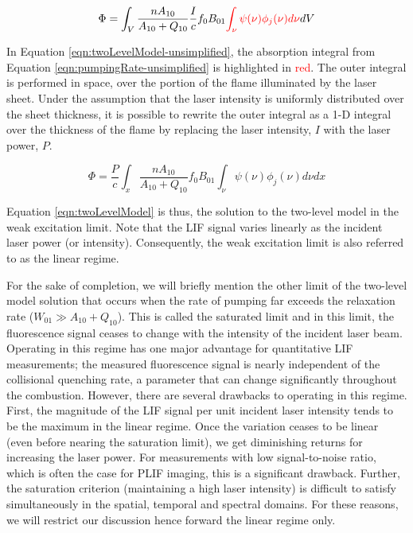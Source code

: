 \begin{equation}
  \Phi = \int_V \frac{n A_{10}}{A_{10} + Q_{10}} \frac{I}{c} f_0 B_{01} \textcolor{red}{\int_\nu \psi(\nu) \phi_j(\nu) d\nu} dV
  \label{eqn:twoLevelModel-unsimplified}
\end{equation}


In Equation \ref{eqn:twoLevelModel-unsimplified}, the absorption integral from Equation \ref{eqn:pumpingRate-unsimplified} is highlighted in \textcolor{red}{red}.
The outer integral is performed in space, over the portion of the flame illuminated by the laser sheet.
Under the assumption that the laser intensity is uniformly distributed over the sheet thickness, it is possible to rewrite the outer integral as a 1-D integral over the thickness of the flame by replacing the laser intensity, \(I\) with the laser power, \(P\).

\begin{equation}
  \Phi = \frac{P}{c} \int_x \frac{n A_{10}}{A_{10}+Q_{10}} f_0 B_{01} \int_\nu \psi(\nu) \phi_j(\nu) d\nu dx
  \label{eqn:twoLevelModel}
\end{equation}


Equation \ref{eqn:twoLevelModel} is thus, the solution to the two-level model in the weak excitation limit.
Note that the LIF signal varies linearly as the incident laser power (or intensity).
Consequently, the weak excitation limit is also referred to as the linear regime.

For the sake of completion, we will briefly mention the other limit of the two-level model solution that occurs when the rate of pumping far exceeds the relaxation rate (\(W_{01} \gg A_{10} + Q_{10}\)).
This is called the saturated limit and in this limit, the fluorescence signal ceases to change with the intensity of the incident laser beam.
Operating in this regime has one major advantage for quantitative LIF measurements; the measured fluorescence signal is nearly independent of the collisional quenching rate, a parameter that can change significantly throughout the combustion.
However, there are several drawbacks to operating in this regime.
First, the magnitude of the LIF signal per unit incident laser intensity tends to be the maximum in the linear regime.
Once the variation ceases to be linear (even before nearing the saturation limit), we get diminishing returns for increasing the laser power.
For measurements with low signal-to-noise ratio, which is often the case for PLIF imaging, this is a significant drawback.
Further, the saturation criterion (maintaining a high laser intensity) is difficult to satisfy simultaneously in the spatial, temporal and spectral domains.
For these reasons, we will restrict our discussion hence forward the linear regime only.

